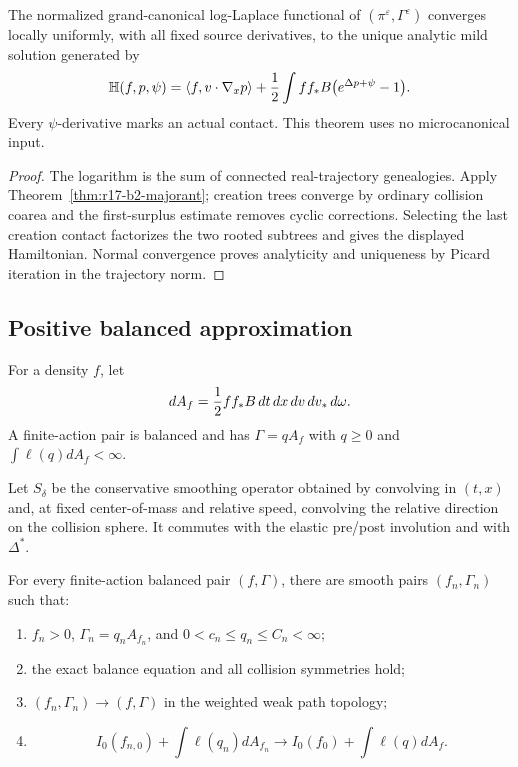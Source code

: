 \begin{theorem}
\label{thm:r17-b2-pressure}
The normalized grand-canonical log-Laplace functional of
\((\pi^\varepsilon,\Gamma^\varepsilon)\) converges locally uniformly, with
all fixed source derivatives, to the unique analytic mild solution generated
by
\[
 \mathbb H(f,p,\psi)
 =\langle f,v\cdot\nabla_xp\rangle
 +{1\over2}\int ff_*B
       \bigl(e^{\Delta p+\psi}-1\bigr).
\]
Every \(\psi\)-derivative marks an actual contact.  This theorem uses no
microcanonical input.
\end{theorem}

\begin{proof}
The logarithm is the sum of connected real-trajectory genealogies.  Apply
Theorem~\ref{thm:r17-b2-majorant}; creation trees converge by ordinary
collision coarea and the first-surplus estimate removes cyclic corrections.
Selecting the last creation contact factorizes the two rooted subtrees and
gives the displayed Hamiltonian.  Normal convergence proves analyticity and
uniqueness by Picard iteration in the trajectory norm.
\end{proof}

\subsection{Positive balanced approximation}

For a density \(f\), let
\[
 dA_f={1\over2}ff_*B\,dt\,dx\,dv\,dv_*\,d\omega.
\]
A finite-action pair is balanced and has
\(\Gamma=qA_f\) with \(q\ge0\) and
\(\int\ell(q)dA_f<\infty\).

Let \(S_\delta\) be the conservative smoothing operator obtained by
convolving in \((t,x)\) and, at fixed center-of-mass and relative speed,
convolving the relative direction on the collision sphere.  It commutes with
the elastic pre/post involution and with \(\Delta^*\).

\begin{theorem}
\label{thm:r17-b2-density}
For every finite-action balanced pair \((f,\Gamma)\), there are smooth pairs
\((f_n,\Gamma_n)\) such that:
\begin{enumerate}[label=(\roman*)]
\item \(f_n>0\), \(\Gamma_n=q_nA_{f_n}\), and
      \(0<c_n\le q_n\le C_n<\infty\);
\item the exact balance equation and all collision symmetries hold;
\item \((f_n,\Gamma_n)\to(f,\Gamma)\) in the weighted weak path topology;
\item
\[
 I_0(f_{n,0})+\int\ell(q_n)dA_{f_n}
 \longrightarrow I_0(f_0)+\int\ell(q)dA_f.
\]
\end{enumerate}
\end{theorem}

